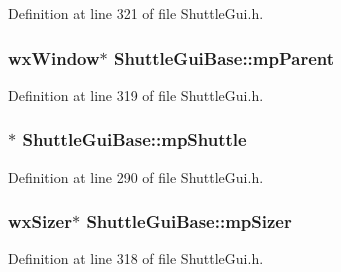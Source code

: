 Definition at line 321 of file Shuttle\+Gui.\+h.

\subsubsection[{\texorpdfstring{mp\+Parent}{mpParent}}]{\setlength{\rightskip}{0pt plus 5cm}wx\+Window$\ast$ Shuttle\+Gui\+Base\+::mp\+Parent\hspace{0.3cm}{\ttfamily [protected]}}\hypertarget{class_shuttle_gui_base_ac6fe76ac2b65ed2541d7cf3eb4d9f677}{}\label{class_shuttle_gui_base_ac6fe76ac2b65ed2541d7cf3eb4d9f677}


Definition at line 319 of file Shuttle\+Gui.\+h.

\subsubsection[{\texorpdfstring{mp\+Shuttle}{mpShuttle}}]{$\ast$ Shuttle\+Gui\+Base\+::mp\+Shuttle\hspace{0.3cm}{\ttfamily [protected]}}\hypertarget{class_shuttle_gui_base_a76673f4627fcdabed6c79df5184aebde}{}\label{class_shuttle_gui_base_a76673f4627fcdabed6c79df5184aebde}


Definition at line 290 of file Shuttle\+Gui.\+h.

\subsubsection[{\texorpdfstring{mp\+Sizer}{mpSizer}}]{\setlength{\rightskip}{0pt plus 5cm}wx\+Sizer$\ast$ Shuttle\+Gui\+Base\+::mp\+Sizer\hspace{0.3cm}{\ttfamily [protected]}}\hypertarget{class_shuttle_gui_base_a8d3582fb89afaea388f2f8daa77adb03}{}\label{class_shuttle_gui_base_a8d3582fb89afaea388f2f8daa77adb03}


Definition at line 318 of file Shuttle\+Gui.\+h.

